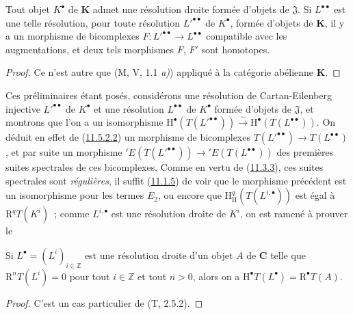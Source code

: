 \begin{corollary}[11.5.2.2]
\label{0.11.5.2.2-fr}
Tout objet $K^\bullet$ de $\boldsymbol{K}$ admet une résolution droite formée
d'objets de $\mathfrak J$. Si $L^{\bullet\bullet}$ est une telle résolution,
pour toute résolution $L'^{\bullet\bullet}$ de $K^\bullet$, formée d'objets
de $\boldsymbol{K}$, il y a un morphisme de bicomplexes
$F:L'^{\bullet\bullet}\to L^{\bullet\bullet}$ compatible avec les
augmentations, et deux tels morphismes $F$, $F'$ sont homotopes.
\end{corollary}

\begin{proof}
Ce n'est autre que (M, V, 1.1 \emph{a)}) appliqué à la catégorie abélienne
$\boldsymbol{K}$.
\end{proof}

\begin{env}[11.5.2.3]
\label{0.11.5.2.3-fr}
Ces préliminaires étant posés, considérons une résolution de
Cartan-Eilenberg injective $L'^{\bullet\bullet}$ de $K^\bullet$ et une
résolution $L^{\bullet\bullet}$ de $K^\bullet$ formée d'objets de
$\mathfrak J$, et montrons que l'on a un isomorphisme
$\mathrm H^\bullet(T(L'^{\bullet\bullet}))\xrightarrow{\sim}\mathrm H^\bullet(T(L^{\bullet\bullet}))$.
On déduit en effet de (\hyperref[0.11.5.2.2-fr]{11.5.2.2}) un morphisme de
bicomplexes $T(L'^{\bullet\bullet})\to T(L^{\bullet\bullet})$, et par suite
un morphisme
$'E(T(L'^{\bullet\bullet}))\to{}'E(T(L^{\bullet\bullet}))$ des premières
suites spectrales de ces bicomplexes. Comme en vertu de
(\hyperref[0.11.3.3-fr]{11.3.3}), ces suites spectrales sont \emph{régulières}, il
suffit (\hyperref[0.11.1.5-fr]{11.1.5}) de voir que le morphisme précédent est
un isomorphisme pour les termes $E_2$, ou encore que
$\mathrm H_{\mathrm{II}}^q(T(L^{i,\bullet}))$ est égal à
$\mathrm R^qT(K^i)$~; comme $L^{i,\bullet}$ est une résolution droite de
$K^i$, on est ramené à prouver le
\end{env}

\begin{lemma}[11.5.2.4]
\label{0.11.5.2.4-fr}
Si $L^\bullet=(L^i)_{i\in\mathbb Z}$ est une résolution droite d'un objet $A$
de $\boldsymbol{C}$ telle que $\mathrm R^nT(L^i)=0$ pour tout $i\in\mathbb Z$ et
tout $n>0$, alors on a
$\mathrm H^\bullet T(L^\bullet)=\mathrm R^\bullet T(A)$.
\end{lemma}

\begin{proof}
C'est un cas particulier de (T, 2.5.2).
\end{proof}

